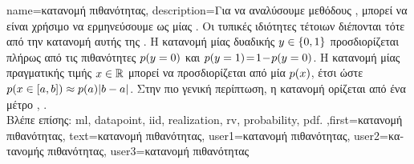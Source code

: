{name={\foreignlanguage{greek}{κατανομή πιθανότητας}},
	description={\foreignlanguage{greek}{Για να αναλύσουμε μεθόδους} , 
		\foreignlanguage{greek}{μπορεί να είναι χρήσιμο να ερμηνεύσουμε}  \foreignlanguage{greek}{ως} 
		  \foreignlanguage{greek}{μίας} . \foreignlanguage{greek}{Οι τυπικές  
		ιδιότητες τέτοιων}  \foreignlanguage{greek}{διέπονται τότε από την κατανομή}   
		\foreignlanguage{greek}{αυτής της} . \foreignlanguage{greek}{Η κατανομή}  
		\foreignlanguage{greek}{μίας δυαδικής}  $y \in \{0,1\}$ \foreignlanguage{greek}{προσδιορίζεται πλήρως
		από τις πιθανότητες $p({y = 0})$ και 
		$p({y=1})\!=\!1\!-\!p({y=0})$. Η κατανομή}  
		\foreignlanguage{greek}{μίας}  \foreignlanguage{greek}{πραγματικής τιμής $x \in \mathbb{R}$ μπορεί να 
		προσδιορίζεται από μία}  $p(x)$, \foreignlanguage{greek}{έτσι ώστε $p({ x \in [a,b] }) \approx  p(a) |b-a|$. 
	    	Στην πιο γενική περίπτωση, η κατανομή}  \foreignlanguage{greek}{ορίζεται από ένα μέτρο} 
		 \cite{BillingsleyProbMeasure}, \cite{GrayProbBook}.\\
	    \foreignlanguage{greek}{Βλέπε επίσης:} \gls{ml}, \gls{datapoint}, \gls{iid}, \gls{realization}, \gls{rv}, \gls{probability}, \gls{pdf}.
	    },first={\foreignlanguage{greek}{κατανομή πιθανότητας}},
	    text={\foreignlanguage{greek}{κατανομή πιθανότητας}},
	    user1={\foreignlanguage{greek}{κατανομή πιθανότητας}}, %
	    user2={\foreignlanguage{greek}{κατανομής πιθανότητας}}, %
	    user3={\foreignlanguage{greek}{κατανομή πιθανότητας}} %
}

